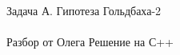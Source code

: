 {\large Задача А. Гипотеза Гольдбаха-2}
\\
\\
Разбор от Олега
\newpage
{\large Решение на С++}
\\
\\

